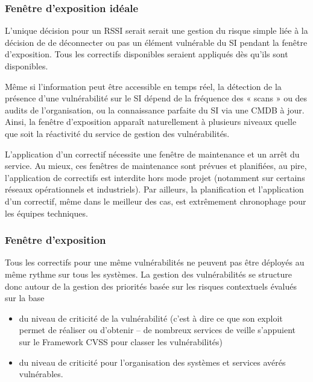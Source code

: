 \begin{frame}
\frametitle<presentation>{Fenêtre d'exposition idéale}
\end{frame}

L’unique décision pour un RSSI serait  serait une gestion du risque simple liée à la décision de  de déconnecter ou pas un élément vulnérable du SI pendant la fenêtre d’exposition. Tous les correctifs disponibles seraient appliqués dès qu’ils sont disponibles.

Même si l’information peut être accessible en temps réel, la détection de la présence d’une vulnérabilité sur le SI dépend de la fréquence des « scans » ou des audits de l’organisation, ou la connaissance parfaite du SI via une CMDB à jour. Ainsi, la fenêtre d’exposition apparaît naturellement à plusieurs niveaux quelle que soit la réactivité du service de gestion des vulnérabilités.

 L’application d’un correctif nécessite une fenêtre de maintenance et un arrêt du service. Au mieux, ces fenêtres de maintenance sont prévues et planifiées, au pire, l’application de correctifs est interdite hors mode projet (notamment sur certains réseaux opérationnels et industriels). Par ailleurs, la planification et l’application d’un correctif, même dans le meilleur des cas, est extrêmement chronophage pour les équipes techniques.
 
\begin{frame}
\frametitle<presentation>{Fenêtre d'exposition}
\end{frame}

Tous les correctifs  pour une même vulnérabilités ne peuvent pas être déployés au même rythme sur tous les systèmes. La gestion des vulnérabilités se structure donc autour de la gestion des priorités basée sur les risques contextuels évalués sur la base  

\begin{itemize}
  \item du niveau de criticité de la vulnérabilité (c’est à dire ce que son exploit permet de réaliser ou d’obtenir – de nombreux services de veille s’appuient sur le Framework CVSS pour classer les vulnérabilités)
  \item du niveau de criticité pour l’organisation des systèmes et services avérés vulnérables.
\end{itemize}


